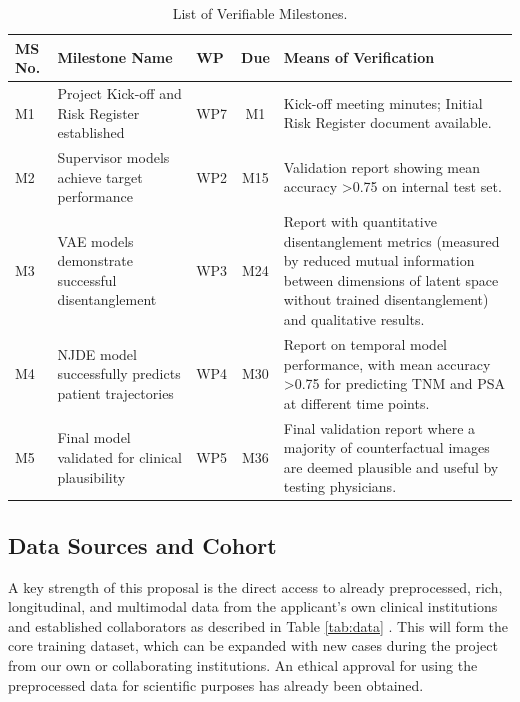 \documentclass[11pt, a4paper]{article}
\begin{document}
\begin{table}[H]
    \centering
    \caption{List of Verifiable Milestones.}
    \label{tab:milestones}
    \small
    \begin{tabular}{lp{5.5cm}lcp{5cm}}
        \toprule
        \textbf{MS No.} & \textbf{Milestone Name} & \textbf{WP} & \textbf{Due} & \textbf{Means of Verification} \\
        \midrule
        M1 & Project Kick-off and Risk Register established & WP7 & M1 & Kick-off meeting minutes; Initial Risk Register document available. \\
        M2 & Supervisor models achieve target performance & WP2 & M15 & Validation report showing mean accuracy >0.75 on internal test set. \\
        M3 & VAE models demonstrate successful disentanglement & WP3 & M24 & Report with quantitative disentanglement metrics (measured by reduced mutual information between dimensions of latent space without trained disentanglement) and qualitative results. \\
        M4 & NJDE model successfully predicts patient trajectories & WP4 & M30 & Report on temporal model performance, with mean accuracy >0.75 for predicting TNM and PSA at different time points. \\
        M5 & Final model validated for clinical plausibility & WP5 & M36 & Final validation report where a majority of counterfactual images are deemed plausible and useful by testing physicians. \\
        \bottomrule
    \end{tabular}
\end{table}

\subsection{Data Sources and Cohort}
A key strength of this proposal is the direct access to already preprocessed, rich, longitudinal, and multimodal data from the applicant's own clinical institutions and established collaborators as described in Table \ref{tab:data} . This will form the core training dataset, which can be expanded with new cases during the project from our own or collaborating institutions. An ethical approval for using the preprocessed data for scientific purposes has already been obtained.
\end{document}
